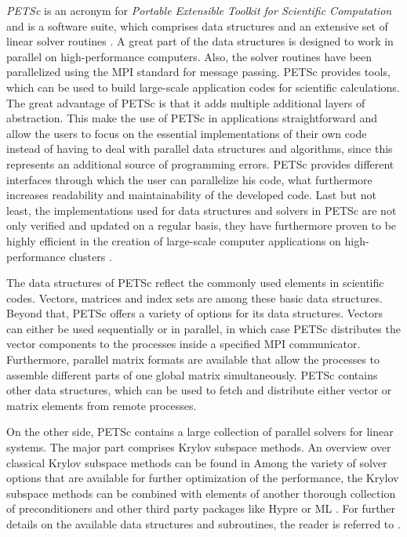 \emph{PETSc} is an acronym for \emph{Portable Extensible Toolkit for Scientific Computation} and is a software suite, which comprises data structures and an extensive set of linear solver routines \cite{petsc-web-page,petsc-efficient}. A great part of the data structures is designed to work in parallel on high-performance computers. Also, the solver routines have been parallelized using the MPI standard for message passing. PETSc provides tools, which can be used to build large-scale application codes for scientific calculations. The great advantage of PETSc is that it adds multiple additional layers of abstraction. This make the use of PETSc in applications straightforward and allow the users to focus on the essential implementations of their own code instead of having to deal with parallel data structures and algorithms, since this represents an additional source of programming errors. PETSc provides different interfaces through which the user can parallelize his code, what furthermore increases readability and maintainability of the developed code. Last but not least, the implementations used for data structures and solvers in PETSc are not only verified and updated on a regular basis, they have furthermore proven to be highly efficient in the creation of large-scale computer applications on high-performance clusters \cite{bonfiglioli12,gropp00,karimian05}.

The data structures of PETSc reflect the commonly used elements in scientific codes. Vectors, matrices and index sets are among these basic data structures. Beyond that, PETSc offers a variety of options for its data structures. Vectors can either be used sequentially or in parallel, in which case PETSc distributes the vector components to the processes inside a specified MPI communicator. Furthermore, parallel matrix formats are available that allow the processes to assemble different parts of one global matrix simultaneously. PETSc contains other data structures, which can be used to fetch and distribute either vector or matrix elements from remote processes.

On the other side, PETSc contains a large collection of parallel solvers for linear systems. The major part comprises Krylov subspace methods. An overview over classical Krylov subspace methods can be found in \cite{saad03} Among the variety of solver options that are available for further optimization of the performance, the Krylov subspace methods can be combined with elements of another thorough collection of preconditioners and other third party packages like Hypre \cite{hypre} or ML \cite{ml}. For further details on the available data structures and subroutines, the reader is referred to \cite{petsc-user-ref,petsc-web-page}.

